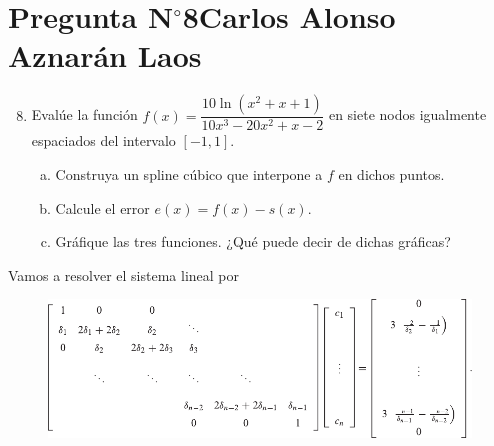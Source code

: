 \section{Pregunta N$^{\circ}$8\qquad Carlos Alonso Aznarán Laos}

\begin{frame}
    \begin{enumerate}\setcounter{enumi}{7}
        \item

              Evalúe la función
              \begin{math}
                  f\left(x\right)=
                  \dfrac{
                  10\ln\left(x^{2}+x+1\right)
                  }{
                  10x^{3}-20x^{2}+x-2
                  }
              \end{math}
              en siete nodos igualmente espaciados del intervalo
              $\left[-1,1\right]$.

              \begin{enumerate}[a)]
                  \item

                        Construya un spline cúbico que interpone a
                        $f$ en dichos puntos.

                  \item

                        Calcule el error
                        \begin{math}
                            e\left(x\right)=
                            f\left(x\right)-
                            s\left(x\right)
                        \end{math}.

                  \item

                        Gráfique las tres funciones.
                        ¿Qué puede decir de dichas gráficas?
              \end{enumerate}
    \end{enumerate}

    \begin{solution}
        Vamos a resolver el sistema lineal por

        \begin{figure}[ht!]
            \centering
            \includegraphics[width=.65\paperwidth]{system}
        \end{figure}
    \end{solution}
\end{frame}

